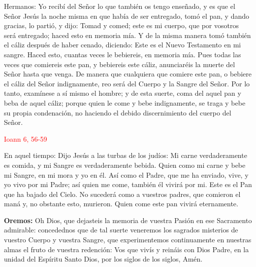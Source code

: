 \documentclass[10pt]{article}
\begin{document}
\begin{multicols}{2}
      Hermanos: Yo recibí del Señor lo que también os tengo enseñado, y es que el Señor Jesús la noche misma en que había de ser entregado, tomó el pan, y dando gracias, lo partió, y dijo:
      Tomad y comed; este es mi cuerpo, que por vosotros será entregado; haced esto en memoria mía. Y de la misma manera tomó también el cáliz después de haber cenado, diciendo: Este es el
      Nuevo Testamento en mi sangre. Haced esto, cuantas veces le bebiereis, en memoria mía. Pues todas las veces que comiereis este pan, y bebiereis este cáliz, anunciaréis la muerte del
      Señor hasta que venga. De manera que cualquiera que comiere este pan, o bebiere el cáliz del Señor indignamente, reo será del Cuerpo y la Sangre del Señor. Por lo tanto, examínese a
      sí mismo el hombre; y de esta suerte, coma del aquel pan y beba de aquel cáliz; porque quien le come y bebe indignamente, se traga y bebe su propia condenación, no haciendo el debido
      discernimiento del cuerpo del Señor.\newline

      \hfill\textcolor{red}{Ioann 6, 56-59}

      En aquel tiempo: Dijo Jesús a las turbas de los judíos: Mi carne verdaderamente es comida, y mi Sangre es verdaderamente bebida. Quien como mi carne y bebe mi Sangre, en mi mora y yo en él.
      Así como el Padre, que me ha enviado, vive, y yo vivo por mi Padre; así quien me come, también él vivirá por mi. Este es el Pan que ha bajado del Cielo. No sucederá como a vuestros padres,
      que comieron el maná y, no obstante esto, murieron. Quien come este pan vivirá eternamente.\newline

      \begin{otherlanguage}{latin}
            

            

            

      \end{otherlanguage}
      \newline

      \textbf{Oremos:} Oh Dios, que dejasteis la memoria de vuestra Pasión en ese Sacramento admirable: concedednos que de tal suerte veneremos los sagrados misterios de vuestro Cuerpo 
      y vuestra Sangre, que experimentemos continuamente en nuestras almas el fruto de vuestra redención: Vos que vivís y reináis con Dios Padre, en la unidad del Espíritu Santo Dios, 
      por los siglos de los siglos, Amén.


\end{multicols}
\end{document}
